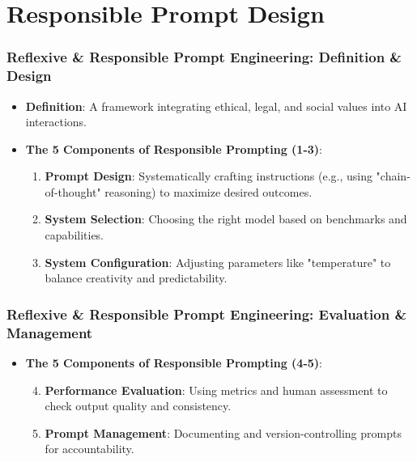 \documentclass{beamer}
\begin{document}
\section{Responsible Prompt Design}

\begin{frame}
    \frametitle{Reflexive \& Responsible Prompt Engineering: Definition \& Design}
    \begin{itemize}
        \item \textbf{Definition}: A framework integrating ethical, legal, and social values into AI interactions.
        \item \textbf{The 5 Components of Responsible Prompting (1-3)}:
        \begin{enumerate}
            \item \textbf{Prompt Design}: Systematically crafting instructions (e.g., using "chain-of-thought" reasoning) to maximize desired outcomes.
            \item \textbf{System Selection}: Choosing the right model based on benchmarks and capabilities.
            \item \textbf{System Configuration}: Adjusting parameters like "temperature" to balance creativity and predictability.
        \end{enumerate}
    \end{itemize}
\end{frame}

\begin{frame}
    \frametitle{Reflexive \& Responsible Prompt Engineering: Evaluation \& Management}
    \begin{itemize}
        \item \textbf{The 5 Components of Responsible Prompting (4-5)}:
        \begin{enumerate}
            \setcounter{enumi}{3}
            \item \textbf{Performance Evaluation}: Using metrics and human assessment to check output quality and consistency.
            \item \textbf{Prompt Management}: Documenting and version-controlling prompts for accountability.
        \end{enumerate}
    \end{itemize}
\end{frame}
\end{document}

